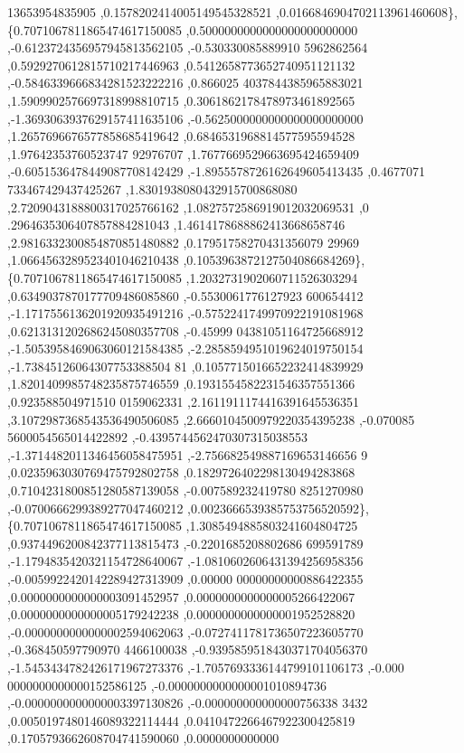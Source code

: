 \begin{DoxyCode}
      13653954835905 ,0.1578202414005149545328521 ,0.0166846904702113961460608\},
\{0.7071067811865474617150085 ,0.5000000000000000000000000 ,-0.6123724356957945813562105 ,-0.530330085889910
      5962862564 ,0.5929270612815710217446963 ,0.5412658773652740951121132 ,-0.5846339666834281523222216 ,0.866025
      4037844385965883021 ,1.5909902576697318998810715 ,0.3061862178478973461892565 ,-1.3693063937629157411635106 
      ,-0.5625000000000000000000000 ,1.2657696676577858685419642 ,0.6846531968814577595594528 ,1.97642353760523747
      92976707 ,1.7677669529663695424659409 ,-0.6051536478449087708142429 ,-1.8955578726162649605413435 ,0.4677071
      733467429437425267 ,1.8301938080432915700868080 ,2.7209043188800317025766162 ,1.0827572586919012032069531 ,0
      .2964635306407857884281043 ,1.4614178688862413668658746 ,2.9816332300854870851480882 ,0.17951758270431356079
      29969 ,1.0664563289523401046210438 ,0.1053963872127504086684269\},
\{0.7071067811865474617150085 ,1.2032731902060711526303294 ,0.6349037870177709486085860 ,-0.5530061776127923
      600654412 ,-1.1717556136201920935491216 ,-0.5752241749970922191081968 ,0.6213131202686245080357708 ,-0.45999
      04381051164725668912 ,-1.5053958469063060121584385 ,-2.2858594951019624019750154 ,-1.73845126064307753388504
      81 ,0.1057715016652232414839929 ,1.8201409985748235875746559 ,0.1931554582231546357551366 ,0.923588504971510
      0159062331 ,2.1611911174416391645536351 ,3.1072987368543536490506085 ,2.6660104500979220354395238 ,-0.070085
      5600054565014422892 ,-0.4395744562470307315038553 ,-1.3714482011346456058475951 ,-2.756682549887169653146656
      9 ,0.0235963030769475792802758 ,0.1829726402298130494283868 ,0.7104231800851280587139058 ,-0.007589232419780
      8251270980 ,-0.0700666299389277047460212 ,0.0023666539385753756520592\},
\{0.7071067811865474617150085 ,1.3085494885803241604804725 ,0.9374496200842377113815473 ,-0.2201685208802686
      699591789 ,-1.1794835420321154728640067 ,-1.0810602606431394256958356 ,-0.0059922420142289427313909 ,0.00000
      00000000000886422355 ,0.0000000000000003091452957 ,0.0000000000000005266422067 ,0.0000000000000005179242238 
      ,0.0000000000000001952528820 ,-0.0000000000000002594062063 ,-0.0727411781736507223605770 ,-0.368450597790970
      4466100038 ,-0.9395859518430371704056370 ,-1.5453434782426171967273376 ,-1.7057693336144799101106173 ,-0.000
      0000000000000152586125 ,-0.0000000000000001010894736 ,-0.0000000000000003397130826 ,-0.000000000000000756338
      3432 ,0.0050197480146089322114444 ,0.0410472266467922300425819 ,0.1705793662608704741590060 ,0.0000000000000

\end{DoxyCode}
